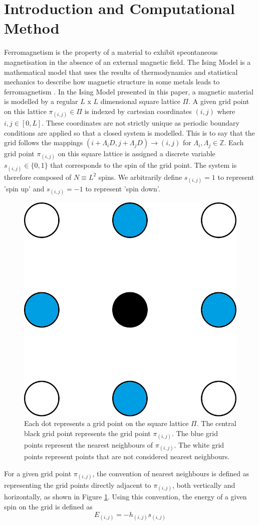 \documentclass[11pt]{iopart}
\begin{document}
\section{Introduction and Computational Method}
Ferromagnetism is the property of a material to exhibit speontaneous magnetisation in the absence of an external magnetic field. The Ising Model is a mathematical model that uses the results of thermodynamics and statistical mechanics to describe how magnetic structure in some metals leads to ferromagnetism \cite{handout}. In the Ising Model presented in this paper, a magnetic material is modelled by a regular $L$ x $L$ dimensional square lattice $\Pi$. A given grid point on this lattice $\pi_{(i,j)} \in \Pi$ is indexed by cartesian coordinates $(i, j)$ where $i, j \in [0, L]$. These coordinates are not strictly unique as periodic boundary conditions are applied so that a closed system is modelled. This is to say that the grid follows the mappings $(i + \Lambda_i D, j + \Lambda_j D) \to (i, j)$ for $\Lambda_i, \Lambda_j \in \mathbb{Z}$. Each grid point $\pi_{(i, j)}$ on this square lattice is assigned a discrete variable  $s_{(i, j)} \in \{0, 1\}$ that corresponds to the spin of the grid point. The system is therefore composed of $N \equiv L^2$ spins. We arbitrarily define $s_{(i, j)} = 1$ to represent 'spin up' and $s_{(i,j)} = -1$ to represent 'spin down'.
\begin{figure}[b]
  \centering
  \includegraphics[width=0.10\linewidth]{images/nearestneighbour/4x/nearestneighbour@4x.png}
  \caption{Each dot represents a grid point on the square lattice $\Pi$. The central black grid point represents the grid point $\pi_{(i, j)}$. The blue grid points represent the nearest neighbours of $\pi_{(i, j)}$. The white grid points represent points that are not considered nearest neighbours.}
  \label{fig:nearestneighbours}
\end{figure}
For a given grid point $\pi_{(i, j)}$, the convention of nearest neighbours is defined as representing the grid points directly adjacent to $\pi_{(i,j)}$, both vertically and horizontally, as shown in Figure \ref{fig:nearestneighbours}. Using this convention, the energy of a given spin on the grid is defined as \cite{handout}
\begin{equation}
E_{(i, j)} = -h_{(i, j)} s_{(i, j)}
\end{equation}
\end{document}
